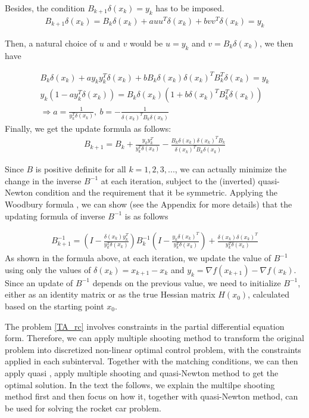\documentclass  [
  paper    = a4,
  BCOR     = 10mm,
  twoside,
  fontsize = 12pt,
  fleqn,
  toc      = bibnumbered,
  toc      = listofnumbered,
  numbers  = noendperiod,
  headings = normal,
  listof   = leveldown,
  version  = 3.03
]                                       {scrreprt}
\newcommand{\<}{\langle}
\renewcommand{\>}{\rangle}
\begin{document}
   Besides, the condition $B_{k+1}\delta(x_k) = y_k$ has to be imposed.
   \begin{align*}
   B_{k+1}\delta(x_k) = B_k\delta(x_k)  + a u u^T\delta(x_k) + b v v^T\delta(x_k) = y_k
   \end{align*}
   
   Then, a natural choice of $u$ and $v$ would be $u=y_k$ and $v=B_k\delta(x_k)$, we then have
   
   \begin{align*}
   B_k\delta(x_k) + a y_ky^T_k\delta(x_k) + bB_k\delta(x_k) \delta(x_k)^TB_k^T\delta(x_k) = y_k  \\
   y_k(1-ay_k^T\delta(x_k) ) = B_k\delta(x_k)(1+ b \delta(x_k)^TB_k^T\delta(x_k)) \\
   \Rightarrow a = \frac{1}{y_k^T\delta(x_k)}, \  b= - \frac{1}{\delta(x_k)^TB_k\delta(x_k)}
   \end{align*}
   Finally, we get the update formula as follows: 
   \begin{align*}
   B_{k+1} = B_k +  \frac{y_ky_k^T}{y_k^T\delta(x_k)}  - \frac{B_k\delta(x_k)\delta(x_k)^TB_k}{\delta(x_k)^TB_k\delta(x_k)}
   \end{align*}
   
   Since $B$ is positive definite for all $k = 1,2, 3, ...$, we can actually minimize the change in the inverse $B^{-1}$ at each iteration, subject to the (inverted) quasi-Newton condition and the requirement that it be symmetric. Applying the Woodbury formula , we can show (see the Appendix for more details) that the updating formula of inverse $B^{-1}$ is as follows
   
   \begin{align*}
   B_{k+1}^{-1} = (I - \frac{\delta(x_k)y_k^T}{y_k^T\delta(x_k)})B_k^{-1}(I - \frac{y_k\delta(x_k)^T}{y_k^T\delta(x_k)}) +  \frac{\delta(x_k)\delta(x_k)^T}{y_k^T\delta(x_k)} 
   \end{align*}
   As shown in the formula above, at each iteration, we update the value of $B^{-1}$ using only the values of $\delta(x_k) = x_{k+1} -x_k$ and $y_k = \nabla f(x_{k+1}) - \nabla f(x_k)$. Since an update of $B^{-1}$ depends on the previous value, we need to initialize $B^{-1}$, either as an identity matrix or as the true Hessian matrix $H(x_0)$, calculated based on the starting point $x_0$.
   
   The problem \ref{TA_rc} involves constraints in the partial differential equation form. Therefore, we can apply multiple shooting method to transform the original problem into  discretized non-linear optimal control problem, with the constraints applied in each subinterval. Together with the matching conditions, we can then apply quasi  , apply multiple shooting and quasi-Newton method to get the optimal solution. In the text the follows, we explain the multilpe shooting method first and then focus on how it, together with quasi-Newton method, can be used for solving the rocket car problem.  
   
\end{document}
